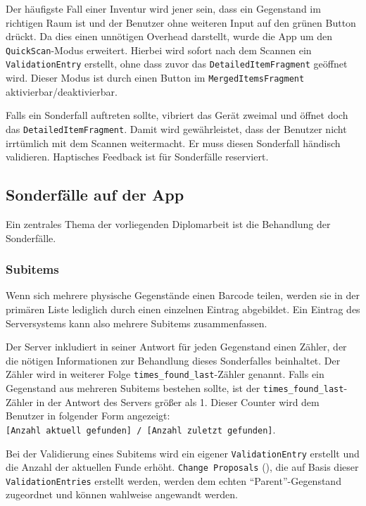 Der häufigste Fall einer Inventur wird jener sein, dass ein Gegenstand
im richtigen Raum ist und der Benutzer ohne weiteren Input auf den
grünen Button drückt. Da dies einen unnötigen Overhead darstellt, wurde
die App um den \texttt{QuickScan}-Modus erweitert. Hierbei wird sofort
nach dem Scannen ein \texttt{ValidationEntry} erstellt, ohne dass zuvor
das \texttt{DetailedItemFragment} geöffnet wird. Dieser Modus ist durch
einen Button im \texttt{MergedItemsFragment} aktivierbar/deaktivierbar.

Falls ein Sonderfall auftreten sollte, vibriert das Gerät zweimal und
öffnet doch das \texttt{DetailedItemFragment}. Damit wird gewährleistet,
dass der Benutzer nicht irrtümlich mit dem Scannen weitermacht. Er muss
diesen Sonderfall händisch validieren. Haptisches Feedback ist für
Sonderfälle reserviert.

\hypertarget{sonderfuxe4lle-auf-der-app}{%
\subsection{Sonderfälle auf der App}\label{sonderfuxe4lle-auf-der-app}}

Ein zentrales Thema der vorliegenden Diplomarbeit ist die Behandlung der
Sonderfälle.

\hypertarget{subitems}{%
\subsubsection{Subitems}\label{subitems}}

Wenn sich mehrere physische Gegenstände einen Barcode teilen, werden sie
in der primären Liste lediglich durch einen einzelnen Eintrag
abgebildet. Ein Eintrag des Serversystems kann also mehrere Subitems
zusammenfassen.

Der Server inkludiert in seiner Antwort für jeden Gegenstand einen
Zähler, der die nötigen Informationen zur Behandlung dieses Sonderfalles
beinhaltet. Der Zähler wird in weiterer Folge
\texttt{times\_found\_last}-Zähler genannt. Falls ein Gegenstand aus
mehreren Subitems bestehen sollte, ist der
\texttt{times\_found\_last}-Zähler in der Antwort des Servers größer als
1. Dieser Counter wird dem Benutzer in folgender Form angezeigt:
\texttt{{[}Anzahl\ aktuell\ gefunden{]}\ /\ {[}Anzahl\ zuletzt\ gefunden{]}}.

Bei der Validierung eines Subitems wird ein eigener
\texttt{ValidationEntry} erstellt und die Anzahl der aktuellen Funde
erhöht. \texttt{Change\ Proposals} (),
die auf Basis dieser \texttt{ValidationEntries} erstellt werden, werden
dem echten ``Parent''-Gegenstand zugeordnet und können wahlweise
angewandt werden.

